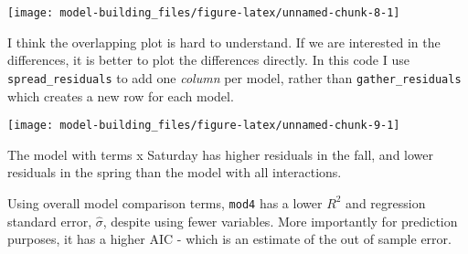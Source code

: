 \documentclass[]{book}
\newenvironment{Shaded}{\begin{snugshade}}{\end{snugshade}}
\newcommand{\CommentTok}[1]{\textcolor[rgb]{0.56,0.35,0.01}{\textit{#1}}}
\newcommand{\DataTypeTok}[1]{\textcolor[rgb]{0.13,0.29,0.53}{#1}}
\newcommand{\FloatTok}[1]{\textcolor[rgb]{0.00,0.00,0.81}{#1}}
\newcommand{\KeywordTok}[1]{\textcolor[rgb]{0.13,0.29,0.53}{\textbf{#1}}}
\newcommand{\NormalTok}[1]{#1}
\newcommand{\OperatorTok}[1]{\textcolor[rgb]{0.81,0.36,0.00}{\textbf{#1}}}
\newcommand{\StringTok}[1]{\textcolor[rgb]{0.31,0.60,0.02}{#1}}
\theoremstyle{definition}
\theoremstyle{definition}
\theoremstyle{definition}
\theoremstyle{remark}
\begin{document}
\begin{center}\texttt{[image: model-building\_files/figure-latex/unnamed-chunk-8-1]} \end{center}

I think the overlapping plot is hard to understand. If we are interested
in the differences, it is better to plot the differences directly. In
this code I use \texttt{spread\_residuals} to add one \emph{column} per
model, rather than \texttt{gather\_residuals} which creates a new row
for each model.

\begin{Shaded}
\end{Shaded}

\begin{center}\texttt{[image: model-building\_files/figure-latex/unnamed-chunk-9-1]} \end{center}

The model with terms x Saturday has higher residuals in the fall, and
lower residuals in the spring than the model with all interactions.

Using overall model comparison terms, \texttt{mod4} has a lower \(R^2\)
and regression standard error, \(\hat\sigma\), despite using fewer
variables. More importantly for prediction purposes, it has a higher AIC
- which is an estimate of the out of sample error.

\begin{Shaded}
\end{Shaded}
\end{document}
